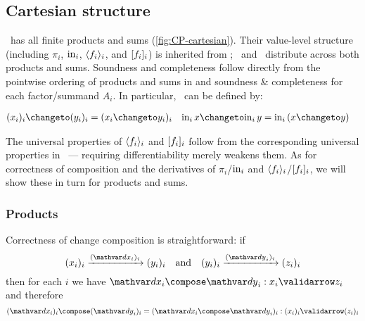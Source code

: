 




\subsection{Cartesian structure}
\label{sec:CP-cartesian}


\CP\ has all finite products and sums (\cref{fig:CP-cartesian}). Their
value-level structure (including $\pi_i$, $\mathrm{in}_i$, $\langle{f_i}\rangle_i$, and
$[{f_i}]_i$) is inherited from \Poset; \valfn\ and \chgfn\ distribute across
both products and sums. Soundness and completeness follow directly from the
pointwise ordering of products and sums in \Poset{} and soundness \&
completeness for each factor/summand $A_i$. In particular, \changetofn\ can be
defined by:

\nopagebreak[2]
\begin{align*}
  (x_i)_i \changeto (y_i)_i &= (x_i \changeto y_i)_i &
  \inj i x \changeto \inj i y &= \inj i (x \changeto y)
\end{align*}

\noindent The universal properties of $\langle{f_i}\rangle_i$ and $[{f_i}]_i$ follow
from the corresponding universal properties in \Poset\ --- requiring
differentiability merely weakens them.
%
As for correctness of composition and the derivatives of $\pi_i$/$\mathrm{in}_i$ and
$\langle{f_i}\rangle_i$/$[{f_i}]_i$, we will show these in turn for products and sums.

\subsubsection{Products}

Correctness of change composition is straightforward: if
%
\[ \vld{(\dx_i)_i}{(x_i)_i}{(y_i)_i}
\quad\text{and}\quad
\vld{(\dy_i)_i}{(y_i)_i}{(z_i)_i} \]
%
then for each $i$ we have $\valid{\dx_i \compose \dy_i}{x_i}{z_i}$ and therefore
%
\[\valid{(\dx_i)_i \compose (\dy_i)_i = (\dx_i \compose
  \dy_i)_i}{(x_i)_i}{(z_i)_i}\]

